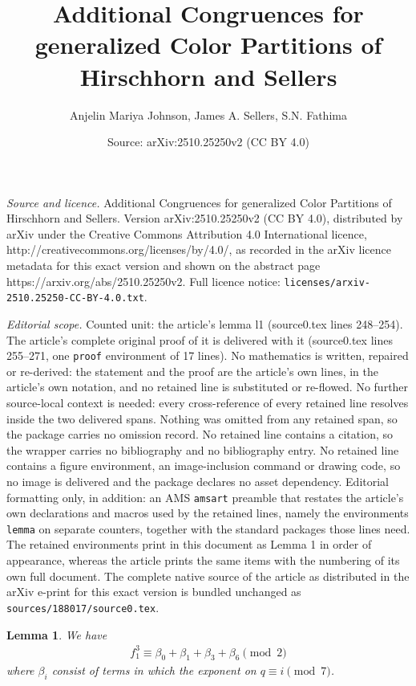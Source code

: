 \documentclass[10pt,a4paper]{amsart}
\title{Additional Congruences for generalized Color Partitions of Hirschhorn and Sellers}
\author{Anjelin Mariya Johnson, James A. Sellers, S.N. Fathima}
\date{Source: arXiv:2510.25250v2 (CC BY 4.0)}
\newtheorem{lemma}{Lemma}
\begin{document}
\maketitle

\noindent\emph{Source and licence.} Additional Congruences for generalized Color Partitions of Hirschhorn and Sellers. Version arXiv:2510.25250v2 (CC BY 4.0), distributed by arXiv under the Creative Commons Attribution 4.0 International licence, http://creativecommons.org/licenses/by/4.0/, as recorded in the arXiv licence metadata for this exact version and shown on the abstract page https://arxiv.org/abs/2510.25250v2. Full licence notice: \texttt{licenses/arxiv-2510.25250-CC-BY-4.0.txt}.\par\smallskip

\noindent\textit{Editorial scope.} Counted unit: the article's lemma l1 (source0.tex lines 248--254). The article's complete original proof of it is delivered with it (source0.tex lines 255--271, one \texttt{proof} environment of 17 lines). No mathematics is written, repaired or re-derived: the statement and the proof are the article's own lines, in the article's own notation, and no retained line is substituted or re-flowed.  No further source-local context is needed: every cross-reference of every retained line resolves inside the two delivered spans.  Nothing was omitted from any retained span, so the package carries no omission record.  No retained line contains a citation, so the wrapper carries no bibliography and no bibliography entry.  No retained line contains a figure environment, an image-inclusion command or drawing code, so no image is delivered and the package declares no asset dependency.  Editorial formatting only, in addition: an AMS \texttt{amsart} preamble that restates the article's own declarations and macros used by the retained lines, namely the environments \texttt{lemma} on separate counters, together with the standard packages those lines need.  The retained environments print in this document as Lemma 1 in order of appearance, whereas the article prints the same items with the numbering of its own full document.  The complete native source of the article as distributed in the arXiv e-print for this exact version is bundled unchanged as \texttt{sources/188017/source0.tex}.
	\begin{lemma}\label{l1}
	We have 
	\begin{align*}
		f_1^3 \equiv \beta_0+\beta_1+\beta_3+\beta_6\pmod{2}
	\end{align*}
where $\beta_i$ consist of terms in which the exponent on $q\equiv i\pmod{7}$.
\end{lemma}
\end{document}
